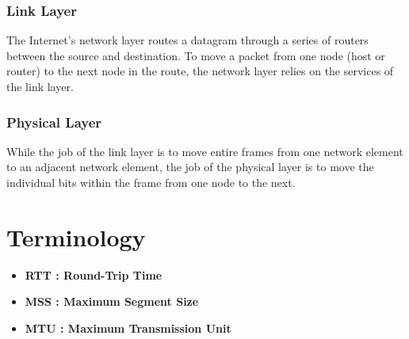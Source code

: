 \documentclass[11pt]{article}
\begin{document}
\newpage

\subsubsection{Link Layer}

The Internet’s network layer routes a datagram through a series of routers between the source and destination. To move a packet from one node (host or router) to the next node in the route, the network layer relies on the services of the link layer.

\subsubsection{Physical Layer}

While the job of the link layer is to move entire frames from one network element to an adjacent network element, the job of the physical layer is to move the individual bits within the frame from one node to the next.



\section{Terminology}

\begin{itemize}

	\item \textbf{RTT : Round-Trip Time}
	
	\item \textbf{MSS : Maximum Segment Size}
	
	\item \textbf{MTU : Maximum Transmission Unit}

\end{itemize}
\end{document}
